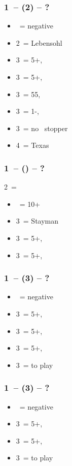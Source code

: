 \documentclass[12pt, a4paper]{article}
\begin{document}
\subsubsection*{1\ntx\ -- (2\spades) -- ?}
\begin{itemize}
    \item \dbl\ = negative
    \item 2\nt\ = Lebensohl
    \item 3\clubs\ = 5+\diams, \invp
    \item 3\diams\ = 5+\hearts, \invp
    \item 3\hearts\ = 55\minor, \gf
    \item 3\spades\ = 1-\spades, \gf
    \item 3\nt\ = no \spades\ stopper
    \item 4\diams\ = Texas
\end{itemize}

\subsubsection*{1\ntx\ -- (\alrts{2\nt}) -- ?}
2\nt\ = \minor
\begin{itemize}
    \item \dbl\ = 10+
    \item 3\clubs\ = Stayman
    \item 3\diams\ = 5+\hearts, \invp
    \item 3\hearts\ = 5+\spades, \invp
\end{itemize}

\subsubsection*{1\ntx\ -- (3\clubs) -- ?}
\begin{itemize}
    \item \dbl\ = negative
    \item 3\diams\ = 5+\hearts, \invp
    \item 3\hearts\ = 5+\spades, \invp
    \item 3\spades\ = 5+\diams, \gf
    \item 3\nt\ = to play
\end{itemize}

\subsubsection*{1\ntx\ -- (3\diams) -- ?}
\begin{itemize}
    \item \dbl\ = negative
    \item 3\hearts\ = 5+\spades, \invp
    \item 3\spades\ = 5+\hearts, \gf
    \item 3\nt\ = to play
\end{itemize}
\end{document}
